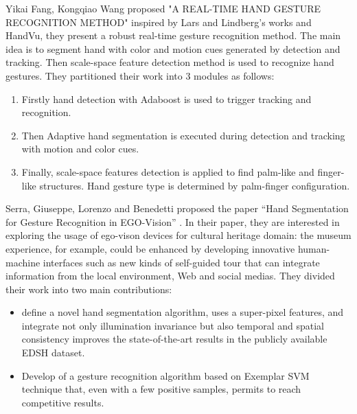 Yikai Fang, Kongqiao Wang proposed "A REAL-TIME HAND GESTURE RECOGNITION METHOD" \cite{relatedsg5} inspired by Lars and Lindberg’s works and HandVu, they present a robust real-time gesture recognition method. The main idea is to segment hand with color and motion cues generated by detection and tracking. Then scale-space feature detection method is used to recognize hand gestures. They partitioned their work into 3 modules as follows:\bigskip
\begin{enumerate}
\item  Firstly hand detection with Adaboost is used to trigger tracking and recognition.
\item Then Adaptive hand segmentation is executed during detection and tracking with motion and color cues.
\item  Finally, scale-space features detection is applied to find palm-like and finger-like structures. Hand gesture type is determined by palm-finger configuration.
\end{enumerate}
\bigskip

Serra, Giuseppe, Lorenzo and Benedetti proposed the paper “Hand Segmentation for Gesture Recognition in EGO-Vision” \cite{relatedsg6}. In their paper, they are interested in exploring the usage of ego-vison devices for cultural heritage domain: the museum experience, for example, could be enhanced by developing innovative human-machine interfaces such as new kinds of self-guided tour that can integrate information from the local environment, Web and social medias.
They divided their work into two main contributions:
\bigskip

\begin{itemize}
\item define a novel hand segmentation algorithm, uses a super-pixel features, and integrate not only illumination invariance but also temporal and spatial consistency improves the state-of-the-art results in the publicly available EDSH dataset.
\item Develop of a gesture recognition algorithm based on Exemplar SVM technique that, even with a few positive samples, permits to reach competitive results.
\end{itemize}
\bigskip

